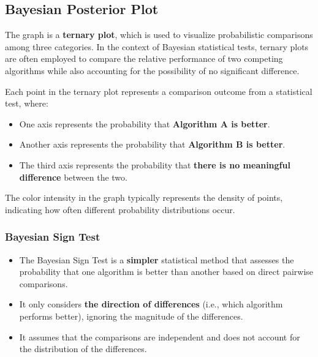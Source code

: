 \documentclass[11pt]{article}
\providecommand{\tightlist}{%
      \setlength{\itemsep}{0pt}\setlength{\parskip}{0pt}}
\begin{document}
    \subsection{Bayesian Posterior Plot}\label{bayesian-posterior-plot}

The graph is a \textbf{ternary plot}, which is used to visualize
probabilistic comparisons among three categories. In the context of
Bayesian statistical tests, ternary plots are often employed to compare
the relative performance of two competing algorithms while also
accounting for the possibility of no significant difference.

Each point in the ternary plot represents a comparison outcome from a
statistical test, where:

\begin{itemize}
\tightlist
\item
  One axis represents the probability that \textbf{Algorithm A is
  better}.
\item
  Another axis represents the probability that \textbf{Algorithm B is
  better}.
\item
  The third axis represents the probability that \textbf{there is no
  meaningful difference} between the two.
\end{itemize}

The color intensity in the graph typically represents the density of
points, indicating how often different probability distributions occur.

\subsubsection{Bayesian Sign Test}\label{bayesian-sign-test}

\begin{itemize}
\tightlist
\item
  The Bayesian Sign Test is a \textbf{simpler} statistical method that
  assesses the probability that one algorithm is better than another
  based on direct pairwise comparisons.
\item
  It only considers \textbf{the direction of differences} (i.e., which
  algorithm performs better), ignoring the magnitude of the differences.
\item
  It assumes that the comparisons are independent and does not account
  for the distribution of the differences.
\end{itemize}
\end{document}
